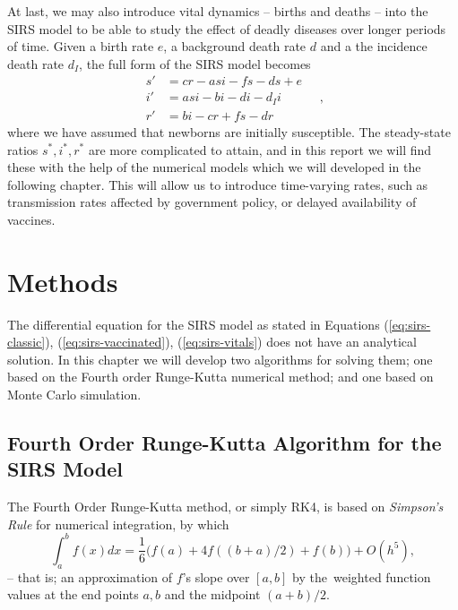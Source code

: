\documentclass[]{article}
\begin{document}
At last, we may also introduce vital dynamics -- births and deaths -- into the SIRS model to be able to study the effect of deadly diseases over longer periods of time. Given a birth rate $e$, a background death rate $d$ and a the incidence death rate $d_I$, the full form of the SIRS model becomes
\begin{equation} \label{eq:sirs-vitals}
\begin{aligned}
	s' &= cr - asi - fs - ds + e \\
	i' &= asi - bi - di -d_Ii\\
	r' &= bi - cr + fs - dr
\end{aligned} \quad ,
\end{equation}
where we have assumed that newborns are initially susceptible. The steady-state ratios $s^*, i^*, r^*$ are more complicated to attain, and in this report we will find these with the help of the numerical models which we will developed in the following chapter. This will allow us to introduce time-varying rates, such as transmission rates affected by government policy, or delayed availability of vaccines. 

\section{Methods} \label{sec:methods}

The differential equation for the SIRS model as stated in Equations (\ref{eq:sirs-classic}), (\ref{eq:sirs-vaccinated}), (\ref{eq:sirs-vitals}) does not have an analytical solution. In this chapter we will develop two algorithms for solving them; one based on the Fourth order Runge-Kutta numerical method; and one based on Monte Carlo simulation.

\subsection{Fourth Order Runge-Kutta Algorithm for the SIRS Model} \label{sec:runge-kutta}
The Fourth Order Runge-Kutta method, or simply RK4, is based on \textit{Simpson's Rule} for numerical integration, by which
\begin{equation} \label{eq:simpsons-rule}
	\int_{a}^{b} f(x) dx = \frac{1}{6} \big( f(a) + 4f((b+a)/2) + f(b) \big) + O(h^5),
\end{equation}
-- that is; an approximation of $f$'s slope over $[a,b]$ by the weighted function values at the end points $a,b$ and the midpoint $(a+b)/2$.
\end{document}
